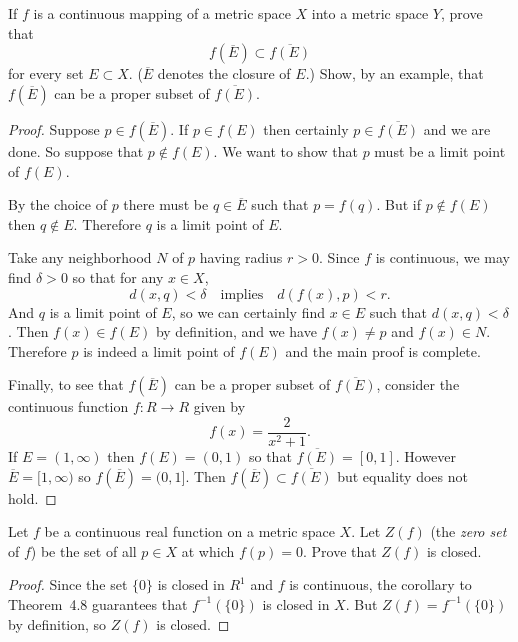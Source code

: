 \label{exercise:continuity:f-of-closure-is-subset-of-closure-of-f}
If $f$ is a continuous mapping of a metric space $X$ into a metric
space $Y$, prove that
\begin{equation*}
  f(\overline{E}) \subset \overline{f(E)}
\end{equation*}
for every set $E\subset X$. ($\overline{E}$ denotes the closure of
$E$.) Show, by an example, that $f(\overline{E})$ can be a proper
subset of $\overline{f(E)}$.
\begin{proof}
  Suppose $p\in f(\overline{E})$. If $p\in f(E)$ then certainly
  $p\in\overline{f(E)}$ and we are done. So suppose that
  $p\not\in f(E)$. We want to show that $p$ must be a limit point of
  $f(E)$.

  By the choice of $p$ there must be $q\in\overline{E}$ such that
  $p = f(q)$. But if $p\not\in f(E)$ then $q\not\in E$. Therefore $q$
  is a limit point of $E$.

  Take any neighborhood $N$ of $p$ having radius $r>0$. Since $f$ is
  continuous, we may find $\delta>0$ so that for any $x\in X$,
  \begin{equation*}
    d(x,q) < \delta
    \quad\text{implies}\quad
    d(f(x),p)<r.
  \end{equation*}
  And $q$ is a limit point of $E$, so we can certainly find $x\in E$
  such that $d(x,q)<\delta$. Then $f(x)\in f(E)$ by definition, and we
  have $f(x)\neq p$ and $f(x)\in N$. Therefore $p$ is indeed a limit
  point of $f(E)$ and the main proof is complete.

  Finally, to see that $f(\overline{E})$ can be a proper subset of
  $\overline{f(E)}$, consider the continuous function $f\colon R\to R$
  given by
  \begin{equation*}
    f(x) = \frac2{x^2 + 1}.
  \end{equation*}
  If $E = (1,\infty)$ then $f(E) = (0,1)$ so that
  $\overline{f(E)} = [0,1]$. However $\overline{E} = [1,\infty)$ so
  $f(\overline{E}) = (0,1]$. Then
  $f(\overline{E})\subset\overline{f(E)}$ but equality does not hold.
\end{proof}

 Let $f$ be a continuous real function on a metric space
$X$. Let $Z(f)$ (the {\em zero set} of $f$) be the set of all $p\in X$
at which $f(p) = 0$. Prove that $Z(f)$ is closed.
\begin{proof}
  Since the set $\{0\}$ is closed in $R^1$ and $f$ is continuous, the
  corollary to Theorem~4.8 guarantees that $f^{-1}(\{0\})$ is closed
  in $X$. But $Z(f) = f^{-1}(\{0\})$ by definition, so $Z(f)$ is
  closed.
\end{proof}

